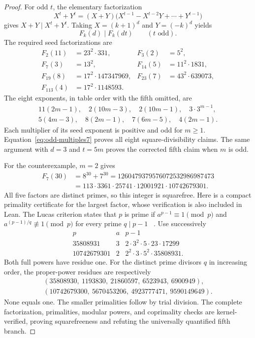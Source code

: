 \documentclass[11pt]{article}
\begin{document}
\begin{proof}
For odd $t$, the elementary factorization
\[
 X^t+Y^t=(X+Y)
 \bigl(X^{t-1}-X^{t-2}Y+\cdots+Y^{t-1}\bigr)
\]
gives $X+Y\mid X^t+Y^t$. Taking $X=(k+1)^d$ and $Y=(-k)^d$ yields
\begin{equation}\label{eq:odd-multiples7}
 F_k(d)\mid F_k(dt)\qquad(t\text{ odd}).
\end{equation}
The required seed factorizations are
\[
\begin{aligned}
F_2(11)&=23^2\cdot331,&F_3(2)&=5^2,\\
F_7(3)&=13^2,&F_{14}(5)&=11^2\cdot1831,\\
F_{19}(8)&=17^2\cdot147347969,&F_{23}(7)&=43^2\cdot639073,\\
F_{113}(4)&=17^2\cdot1148593.&&
\end{aligned}
\]
The eight exponents, in table order with the fifth omitted, are
\[
\begin{gathered}
11(2m-1),\quad2(10m-3),\quad2(10m-1),\quad3\cdot3^{m-1},\\
5(4m-3),\quad8(2m-1),\quad7(6m-5),\quad4(2m-1).
\end{gathered}
\]
Each multiplier of its seed exponent is positive and odd for $m\ge1$.
Equation~\eqref{eq:odd-multiples7} proves all eight square-divisibility
claims. The same argument with $d=3$ and $t=5m$ proves the corrected
fifth claim when $m$ is odd.

For the counterexample, $m=2$ gives
\[
\begin{aligned}
F_7(30)&=8^{30}+7^{30}=1260479379576072532986987473\\
 &=113\cdot3361\cdot25741\cdot12001921\cdot10742679301.
\end{aligned}
\]
All five factors are distinct primes, so this integer is squarefree.
Here is a compact primality certificate for the largest factor, whose
verification is also included in Lean. The Lucas criterion states that
$p$ is prime if $a^{p-1}\equiv1\pmod p$ and
$a^{(p-1)/q}\not\equiv1\pmod p$ for every prime $q\mid p-1$
~\cite{LucasLean}. Use successively
\[
\begin{array}{c|c|l}
p&a&p-1\\ \hline
35808931&3&2\cdot3^2\cdot5\cdot23\cdot17299\\
10742679301&2&2^2\cdot3\cdot5^2\cdot35808931.
\end{array}
\]
Both full powers have residue one. For the distinct prime divisors $q$
in increasing order, the proper-power residues are respectively
\[
\begin{gathered}
(35808930,\ 1193830,\ 21860597,\ 6523943,\ 6900949),\\
(10742679300,\ 5670453206,\ 4923777471,\ 9590149649).
\end{gathered}
\]
None equals one. The smaller primalities follow by trial division.
The complete factorization, primalities, modular powers, and coprimality
checks are kernel-verified, proving squarefreeness and refuting the
universally quantified fifth branch.
\end{proof}
\end{document}

